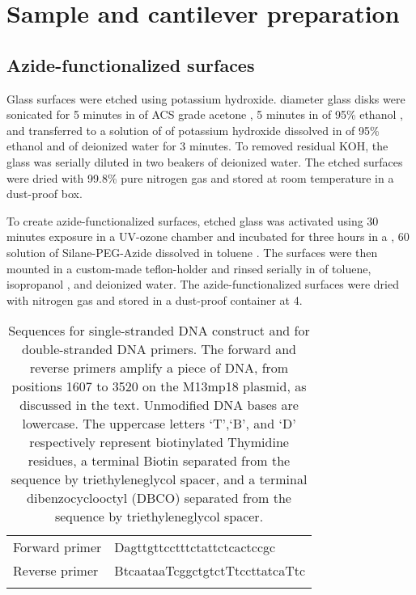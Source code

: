\chapter{Sample and cantilever preparation}

\section{Azide-functionalized surfaces}

Glass surfaces were etched using potassium hydroxide.  diameter glass disks  were sonicated  for 5 minutes in  of ACS grade acetone , 5 minutes in  of 95\% ethanol , and transferred to a solution of  of potassium hydroxide  dissolved in   of 95\% ethanol and  of deionized water  for 3 minutes. To removed residual KOH, the glass was serially diluted in two  beakers of  deionized water. The etched surfaces were dried with 99.8\% pure nitrogen gas  and stored at room temperature in a dust-proof box. 

To create azide-functionalized surfaces, etched glass was activated using 30 minutes exposure in a UV-ozone chamber  and incubated for three hours in a , 60\degreeC{} solution of   Silane-PEG-Azide  dissolved in toluene . The surfaces were then mounted in a custom-made teflon-holder and rinsed serially in  of toluene, isopropanol , and deionized water. The azide-functionalized surfaces were dried with nitrogen gas and stored in a dust-proof container at 4\degreeC{}.  


\begin{table}[htp]
\caption[DNA primer sequences]{Sequences for single-stranded DNA construct and for double-stranded DNA primers. The forward and reverse primers amplify a  piece of DNA, from positions 1607 to 3520 on the M13mp18 plasmid, as discussed in the text. Unmodified DNA bases are lowercase. The uppercase letters `T',`B', and `D' respectively represent biotinylated Thymidine residues, a terminal Biotin separated from the sequence by triethyleneglycol spacer, and a terminal dibenzocyclooctyl (DBCO) separated from the sequence by triethyleneglycol spacer.}
\begin{tabularx}{\textwidth}{ l | l  }
\hline \hline
Forward primer & Dagttgttcctttctattctcactccgc \\ \e 
Reverse primer & BtcaataaTcggctgtctTtccttatcaTtc \\ \e 
\end{tabularx}
\end{table}

